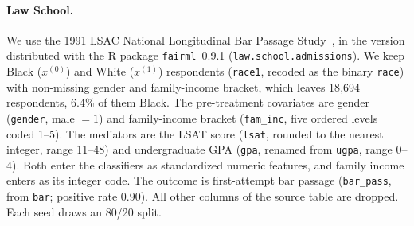 \paragraph{Law School.}
We use the 1991 LSAC National Longitudinal Bar Passage
Study~\citep{wightman1998lsac}, in the version distributed with the R package
\texttt{fairml}~0.9.1 (\texttt{law.school.admissions}). We keep Black
($x^{(0)}$) and White ($x^{(1)}$) respondents (\texttt{race1}, recoded as the
binary \texttt{race}) with non-missing gender and family-income bracket, which
leaves 18{,}694 respondents, 6.4\% of them Black. The pre-treatment covariates
are gender (\texttt{gender}, male $=1$) and family-income bracket
(\texttt{fam\_inc}, five ordered levels coded 1--5). The mediators are the LSAT
score (\texttt{lsat}, rounded to the nearest integer, range 11--48) and
undergraduate GPA (\texttt{gpa}, renamed from \texttt{ugpa}, range 0--4).
Both enter the classifiers as standardized numeric features, and family
income enters as its integer code. The outcome is first-attempt bar passage
(\texttt{bar\_pass}, from \texttt{bar}; positive rate 0.90). All other columns
of the source table are dropped. Each seed draws an 80/20 split.

